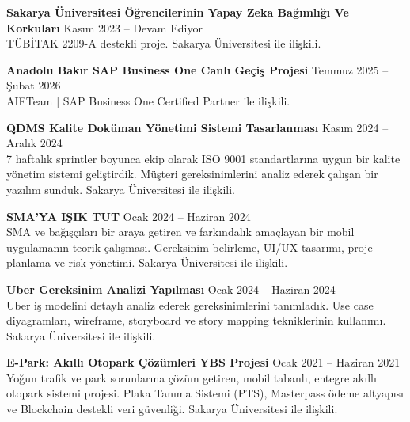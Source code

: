 \documentclass[a4paper,8pt]{article}
\begin{document}
\textbf{Sakarya Üniversitesi Öğrencilerinin Yapay Zeka Bağımlığı Ve Korkuları} \hfill {\small Kasım 2023 -- Devam Ediyor}\\
{\small TÜBİTAK 2209-A destekli proje. Sakarya Üniversitesi ile ilişkili.}

\vspace{0pt}

\textbf{Anadolu Bakır SAP Business One Canlı Geçiş Projesi} \hfill {\small Temmuz 2025 -- Şubat 2026}\\
{\small AIFTeam | SAP Business One Certified Partner ile ilişkili.}

\vspace{0pt}

\textbf{QDMS Kalite Doküman Yönetimi Sistemi Tasarlanması} \hfill {\small Kasım 2024 -- Aralık 2024}\\
{\small 7 haftalık sprintler boyunca ekip olarak ISO 9001 standartlarına uygun bir kalite yönetim sistemi geliştirdik. Müşteri gereksinimlerini analiz ederek çalışan bir yazılım sunduk. Sakarya Üniversitesi ile ilişkili.}

\vspace{0pt}

\textbf{SMA'YA IŞIK TUT} \hfill {\small Ocak 2024 -- Haziran 2024}\\
{\small SMA ve bağışçıları bir araya getiren ve farkındalık amaçlayan bir mobil uygulamanın teorik çalışması. Gereksinim belirleme, UI/UX tasarımı, proje planlama ve risk yönetimi. Sakarya Üniversitesi ile ilişkili.}

\vspace{0pt}

\textbf{Uber Gereksinim Analizi Yapılması} \hfill {\small Ocak 2024 -- Haziran 2024}\\
{\small Uber iş modelini detaylı analiz ederek gereksinimlerini tanımladık. Use case diyagramları, wireframe, storyboard ve story mapping tekniklerinin kullanımı. Sakarya Üniversitesi ile ilişkili.}

\vspace{0pt}

\textbf{E-Park: Akıllı Otopark Çözümleri YBS Projesi} \hfill {\small Ocak 2021 -- Haziran 2021}\\
{\small Yoğun trafik ve park sorunlarına çözüm getiren, mobil tabanlı, entegre akıllı otopark sistemi projesi. Plaka Tanıma Sistemi (PTS), Masterpass ödeme altyapısı ve Blockchain destekli veri güvenliği. Sakarya Üniversitesi ile ilişkili.}

\end{document}
